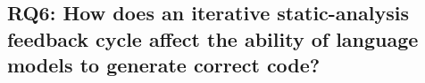 \subsection{RQ6: How does an iterative static-analysis feedback cycle affect the ability of language models to generate correct code?}

\begin{table}[htbp]
\centering
\caption{Code generation under the iterative static-analysis protocol, compared with RQ1. Values are percentages and the second line in each outcome cell reports the change relative to RQ1. Green changes indicate an improvement in the corresponding outcome, while red changes indicate a deterioration. Avg Cyc is the mean number of cycles.}
\label{tab:rq6_generation_delta}
\setlength{\tabcolsep}{1pt}

\newcommand{\better}[1]{\textcolor{green!55!black}{#1}}
\newcommand{\worse}[1]{\textcolor{red!70!black}{#1}}
\newcommand{\lightmodelrule}{%
  \arrayrulecolor{black!15}\specialrule{0.25pt}{0.5pt}{0.5pt}\arrayrulecolor{black}%
}


\end{table}
